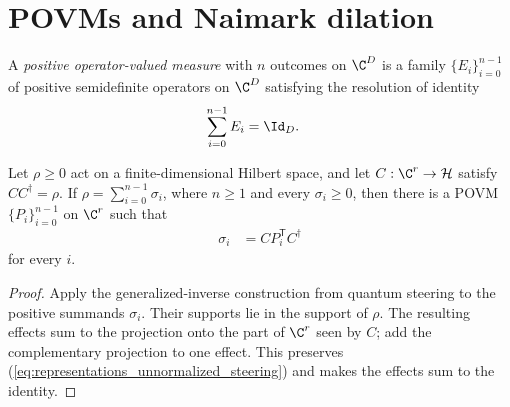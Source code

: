\section{POVMs and Naimark dilation}
\label{sec:povm_naimark}

\begin{definition}\label{def:povm}
    \leanok
    A \emph{positive operator-valued measure} with $n$ outcomes on $\C^D$
    is a family $\{E_i\}_{i=0}^{n-1}$ of positive semidefinite
    operators on $\C^D$ satisfying the resolution of identity
    \begin{align}
        \sum_{i=0}^{n-1}E_i
        &=\Id_D.
        \label{eq:representations_povm_resolution}
    \end{align}
\end{definition}

\begin{lemma}
    \label{lem:unnormalized_povm_steering}
    \leanok
    Let $\rho\geq0$ act on a finite-dimensional Hilbert space, and let
    $C:\C^r\to\mathcal H$ satisfy $CC^\dagger=\rho$. If
    $\rho=\sum_{i=0}^{n-1}\sigma_i$, where $n\geq1$ and every
    $\sigma_i\geq0$, then there is a POVM $\{P_i\}_{i=0}^{n-1}$ on
    $\C^r$ such that
    \begin{align}
        \sigma_i
        &=C P_i^{\mathsf T}C^\dagger
        \label{eq:representations_unnormalized_steering}
    \end{align}
    for every $i$.
\end{lemma}

\begin{proof}\leanok
    Apply the generalized-inverse construction from quantum steering to the
    positive summands $\sigma_i$. Their supports lie in the support of
    $\rho$. The resulting effects sum to the projection onto the part of
    $\C^r$ seen by $C$; add the complementary projection to one effect.
    This preserves (\ref{eq:representations_unnormalized_steering}) and makes
    the effects sum to the identity.
\end{proof}

